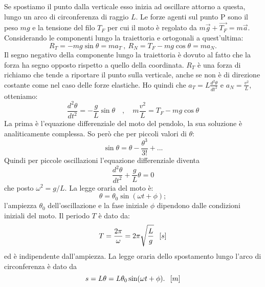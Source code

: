 \documentclass[class=book, crop=false, oneside, 12pt]{standalone}
\begin{document}
Se spostiamo il punto dalla verticale esso inizia ad oscillare attorno a questa, lungo un arco di circonferenza di raggio \(L\).
Le forze agenti sul punto P sono il peso \( m g\) e la tensione del filo \(T_F\) per cui il moto è regolato da \(m \overrightarrow{g} + \overrightarrow{T_F} = m \overrightarrow{a}\).
Considerando le componenti lungo la traiettoria e ortogonali a quest'ultima:
\begin{equation*}
    R_T = -mg \sin \theta = m a_T \ , \ R_N = T_F - mg \cos \theta = m a_N .
\end{equation*}
Il segno negativo della componente lungo la traiettoria è dovuto al fatto che  la forza ha segno opposto rispetto a quello della coordinata.
\(R_T\) è una forza di richiamo che tende a riportare il punto sulla verticale, anche se non è di direzione costante come nel caso delle forze elastiche.\newline
Ho quindi che \(a_T = L \frac {d^2 \theta} {dt^2}\) e \(a_N = \frac {v^2}{L}\), otteniamo:
\begin{equation*}
    \frac{d^{2} \theta}{d t^{2}}=-\frac{g}{L} \sin \theta \quad, \quad m \frac{v^{2}}{L}=T_{F}-m g \cos \theta
\end{equation*}
La prima è l'equazione differenziale del moto del pendolo, la sua soluzione è analiticamente complessa.
So però che per piccoli valori di \(\theta\):
\begin{equation*}
    \sin \theta = \theta - \frac {\theta^3} {3!} + ...
\end{equation*}
Quindi per piccole oscillazioni l'equazione differenziale diventa
\begin{equation*}
    \frac{d^2 \theta}{dt^2} + \frac{g}{L} \theta = 0
\end{equation*}
che posto \(\omega^2 = g/L\).\newline
La legge oraria del moto è:
\begin{equation}
    \theta = \theta_0 \sin (\omega t + \phi) ; 
\end{equation}
l'ampiezza \(\theta_0\) dell'oscillazione e la fase iniziale \(\phi\) dipendono dalle condizioni iniziali del moto.\newline
Il periodo \(T\) è dato da:
\begin{equation}
    T = \frac{2 \pi}{ \omega} = 2 \pi \sqrt{\frac{L}{g}} \hspace{0.2cm} \left[s\right]
\end{equation}
ed è indipendente dall'ampiezza.\newline
La legge oraria dello spostamento lungo l'arco di circonferenza è dato da
\begin{equation*}
    s = L \theta = L \theta_0 \sin (\omega t + \phi). \hspace{0.2cm} \left[m\right]
\end{equation*}
\end{document}

